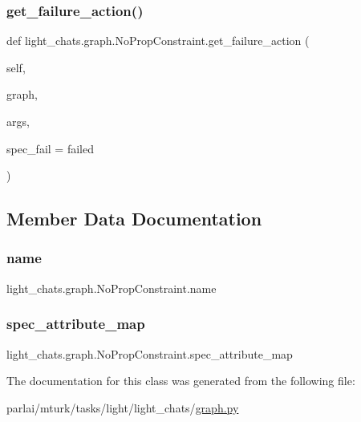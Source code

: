 \subsubsection{\texorpdfstring{get\+\_\+failure\+\_\+action()}{get\_failure\_action()}}
{\footnotesize\ttfamily def light\+\_\+chats.\+graph.\+No\+Prop\+Constraint.\+get\+\_\+failure\+\_\+action (\begin{DoxyParamCaption}\item[{}]{self,  }\item[{}]{graph,  }\item[{}]{args,  }\item[{}]{spec\+\_\+fail = {\ttfamily \textquotesingle{}failed\textquotesingle{}} }\end{DoxyParamCaption})}



\subsection{Member Data Documentation}
\mbox{\label{classlight__chats_1_1graph_1_1NoPropConstraint_a203bf64e3c9ae237a63a23a893df6a0f}} 
\subsubsection{\texorpdfstring{name}{name}}
{\footnotesize\ttfamily light\+\_\+chats.\+graph.\+No\+Prop\+Constraint.\+name\hspace{0.3cm}{\ttfamily [static]}}

\mbox{\label{classlight__chats_1_1graph_1_1NoPropConstraint_a10464e1a8f8bc8216bd0d36c9cdd38dd}} 
\subsubsection{\texorpdfstring{spec\+\_\+attribute\+\_\+map}{spec\_attribute\_map}}
{\footnotesize\ttfamily light\+\_\+chats.\+graph.\+No\+Prop\+Constraint.\+spec\+\_\+attribute\+\_\+map\hspace{0.3cm}{\ttfamily [static]}}



The documentation for this class was generated from the following file\+:\begin{DoxyCompactItemize}
\item 
parlai/mturk/tasks/light/light\+\_\+chats/\hyperlink{parlai_2mturk_2tasks_2light_2light__chats_2graph_8py}{graph.\+py}\end{DoxyCompactItemize}
